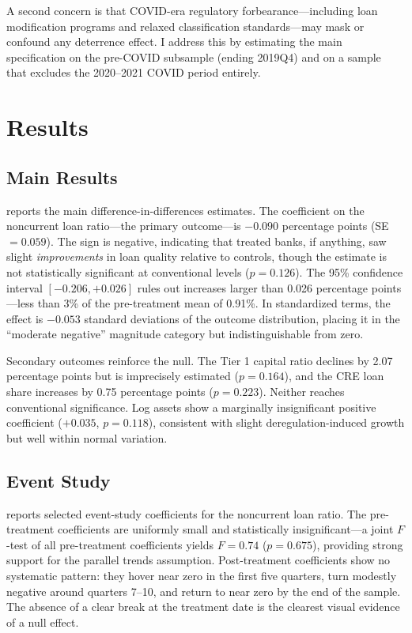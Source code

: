 \documentclass[12pt]{article}
\begin{document}
A second concern is that COVID-era regulatory forbearance---including loan modification programs and relaxed classification standards---may mask or confound any deterrence effect. I address this by estimating the main specification on the pre-COVID subsample (ending 2019Q4) and on a sample that excludes the 2020--2021 COVID period entirely.


\section{Results}

\subsection{Main Results}

 reports the main difference-in-differences estimates. The coefficient on the noncurrent loan ratio---the primary outcome---is $-0.090$ percentage points (SE $= 0.059$). The sign is negative, indicating that treated banks, if anything, saw slight \textit{improvements} in loan quality relative to controls, though the estimate is not statistically significant at conventional levels ($p = 0.126$). The 95\% confidence interval $[-0.206, +0.026]$ rules out increases larger than 0.026 percentage points---less than 3\% of the pre-treatment mean of 0.91\%. In standardized terms, the effect is $-0.053$ standard deviations of the outcome distribution, placing it in the ``moderate negative'' magnitude category but indistinguishable from zero.

Secondary outcomes reinforce the null. The Tier 1 capital ratio declines by 2.07 percentage points but is imprecisely estimated ($p = 0.164$), and the CRE loan share increases by 0.75 percentage points ($p = 0.223$). Neither reaches conventional significance. Log assets show a marginally insignificant positive coefficient ($+0.035$, $p = 0.118$), consistent with slight deregulation-induced growth but well within normal variation.



\subsection{Event Study}

 reports selected event-study coefficients for the noncurrent loan ratio. The pre-treatment coefficients are uniformly small and statistically insignificant---a joint $F$-test of all pre-treatment coefficients yields $F = 0.74$ ($p = 0.675$), providing strong support for the parallel trends assumption. Post-treatment coefficients show no systematic pattern: they hover near zero in the first five quarters, turn modestly negative around quarters 7--10, and return to near zero by the end of the sample. The absence of a clear break at the treatment date is the clearest visual evidence of a null effect.
\end{document}
